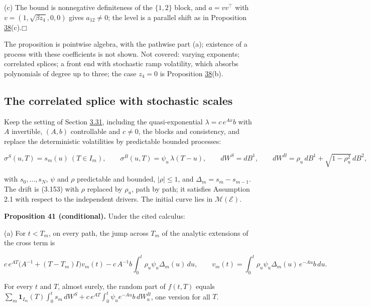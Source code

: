 \documentclass[11pt]{article}
\providecommand{\square}{\mdlgwhtsquare}
\begin{document}
(c) The bound is nonnegative definiteness of the \(\{1,2\}\) block, and \(a=vv^\top\) with \(v=(1,\sqrt{\beta z_4},0,0)\) gives \(a_{12}\neq0\); the level is a parallel shift as in Proposition \hyperref[res:Proposition-38]{38}(c).\hfill$\square$

The proposition is pointwise algebra, with the pathwise part (a); existence of a process with these coefficients is not shown. Not covered: varying exponents; correlated splices; a front end with stochastic ramp volatility, which absorbs polynomials of degree up to three; the case \(z_4=0\) is Proposition \hyperref[res:Proposition-38]{38}(b).

\subsection{The correlated splice with stochastic scales}\label{sec:3.36}

Keep the setting of Section \hyperref[sec:3.31]{3.31}, including the quasi-exponential \(\lambda=c\,e^{Ax}b\) with \(A\) invertible, \((A,b)\) controllable and \(c\neq0\), the blocks and consistency, and replace the deterministic volatilities by predictable bounded processes:

\begin{equation*}
\sigma^S(u,T)=s_m(u)\ (T\in I_m),\qquad \sigma^B(u,T)=\psi_u\,\lambda(T-u),\qquad dW^S=dB^1,\qquad dW^B=\rho_u\,dB^1+\sqrt{1-\rho_u^2}\,dB^2, \tag{3.167}\label{eq:3.167}
\end{equation*}

with \(s_0,\dots,s_N\), \(\psi\) and \(\rho\) predictable and bounded, \(|\rho|\le1\), and \(\Delta_m=s_m-s_{m-1}\). The drift is (3.153) with \(\rho\) replaced by \(\rho_u\), path by path; it satisfies Assumption 2.1 with respect to the independent drivers. The initial curve lies in \(\mathcal M(\mathcal E)\).

\label{res:Proposition-41}
\textbf{Proposition 41 (conditional).} Under the cited calculus:

(a) For \(t<T_m\), on every path, the jump across \(T_m\) of the analytic extensions of the cross term is

\begin{equation*}
c\,e^{AT}\bigl(A^{-1}+(T-T_m)I\bigr)v_m(t)-c\,A^{-1}b\int_0^t\rho_u\psi_u\Delta_m(u)\,du,\qquad v_m(t)=\int_0^t\rho_u\psi_u\Delta_m(u)\,e^{-Au}b\,du. \tag{3.168}\label{eq:3.168}
\end{equation*}

For every \(t\) and \(T\), almost surely, the random part of \(f(t,T)\) equals \(\sum_m\mathbf 1_{I_m}(T)\int_0^ts_m\,dW^S+c\,e^{AT}\int_0^t\psi_ue^{-Au}b\,dW^B_u\), one version for all \(T\).
\end{document}
